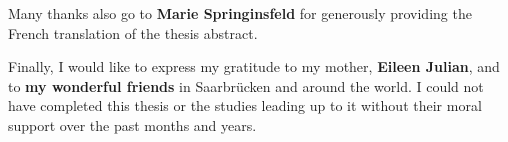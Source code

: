Many thanks also go to \textbf{Marie Springinsfeld} for generously providing the French translation of the thesis abstract.

Finally, I would like to express my gratitude to 
my mother, \textbf{Eileen Julian}, and to \textbf{my wonderful friends} in Saarbrücken and around the world.
I could not have completed this thesis or the studies leading up to it without 
their moral support over the past months and years.